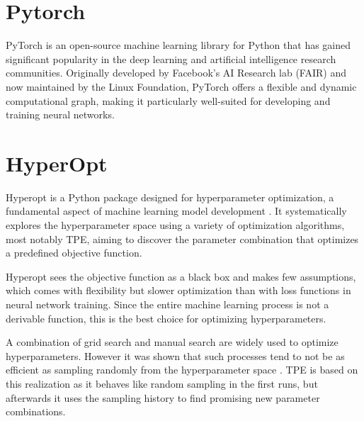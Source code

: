 \documentclass[10pt]{book}
\begin{document}
\section{Pytorch}

PyTorch is an open-source machine learning library for Python that has gained significant popularity in the deep learning and artificial intelligence research communities. Originally developed by Facebook's AI Research lab (FAIR) and now maintained by the Linux Foundation, PyTorch offers a flexible and dynamic computational graph, making it particularly well-suited for developing and training neural networks.

\section{HyperOpt}

Hyperopt is a Python package designed for hyperparameter optimization, a fundamental aspect of machine learning model development \cite{bergstra2013making}. It systematically explores the hyperparameter space using a variety of optimization algorithms, most notably \ac{TPE}, aiming to discover the parameter combination that optimizes a predefined objective function. 

Hyperopt sees the objective function as a black box and makes few assumptions, which comes with flexibility but slower optimization than with loss functions in neural network training. Since the entire machine learning process is not a derivable function, this is the best choice for optimizing hyperparameters.

A combination of grid search and manual search are widely used to optimize hyperparameters. However it was shown that such processes tend to not be as efficient as sampling randomly from the hyperparameter space \cite{bergstra2012random}. \ac{TPE} is based on this realization as it behaves like random sampling in the first runs, but afterwards it uses the sampling history to find promising new parameter combinations. 

\end{document}
